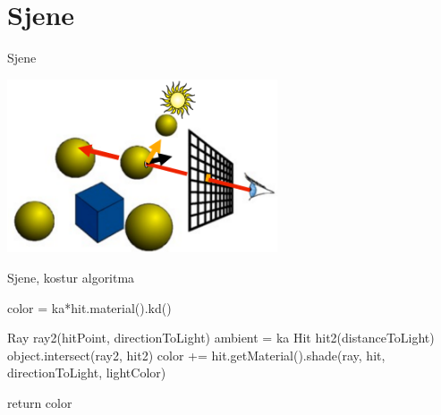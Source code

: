 \documentclass[9pt]{beamer}
\begin{document}
%



\section{Sjene}

\begin{frame}{Sjene}
\begin{center}
	\includegraphics[width=8cm]{slike/sjene_01.png}
\end{center}

\end{frame}

\begin{frame}{Sjene, kostur algoritma}
\begin{algorithm*}[H]
color = ka*hit.material().kd()\;
{
	Ray ray2(hitPoint, directionToLight)\;
	ambient = ka\;
	Hit hit2(distanceToLight)\;
	{
		object.intersect(ray2, hit2)\;
		{
			color += hit.getMaterial().shade(ray, hit, directionToLight, lightColor)\;
		}
	}
	
}
return color\;
\end{algorithm*}
\end{frame}
\end{document}
